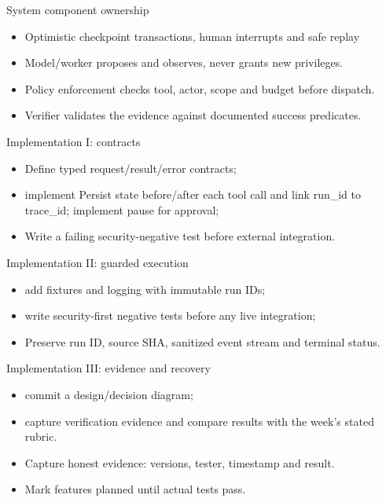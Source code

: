 \documentclass[aspectratio=169,10pt]{beamer}
\begin{document}
\begin{frame}{System component ownership}
\small
\begin{itemize}
\item Optimistic checkpoint transactions, human interrupts and safe replay
\item Model/worker proposes and observes, never grants new privileges.
\item Policy enforcement checks tool, actor, scope and budget before dispatch.
\item Verifier validates the evidence against documented success predicates.
\end{itemize}

\end{frame}

\begin{frame}{Implementation I: contracts}
\small
\begin{itemize}
\item Define typed request/result/error contracts;
\item implement Persist state before/after each tool call and link run\_id to trace\_id; implement pause for approval;
\item Write a failing security-negative test before external integration.
\end{itemize}

\end{frame}

\begin{frame}{Implementation II: guarded execution}
\small
\begin{itemize}
\item add fixtures and logging with immutable run IDs;
\item write security-first negative tests before any live integration;
\item Preserve run ID, source SHA, sanitized event stream and terminal status.
\end{itemize}

\end{frame}

\begin{frame}{Implementation III: evidence and recovery}
\small
\begin{itemize}
\item commit a design/decision diagram;
\item capture verification evidence and compare results with the week's stated rubric.
\item Capture honest evidence: versions, tester, timestamp and result.
\item Mark features planned until actual tests pass.
\end{itemize}

\end{frame}
\end{document}

